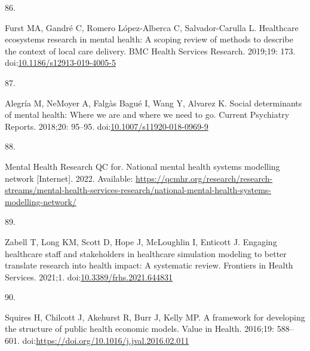 \documentclass[
]{article}
\newlength{\cslhangindent}
\newlength{\csllabelwidth}
\newlength{\cslentryspacingunit} %
\newenvironment{CSLReferences}[2] %
 {%
  \setlength{\parindent}{0pt}
  \ifodd #1
  \let\oldpar\par
  \def\par{\hangindent=\cslhangindent\oldpar}
  \fi
  \setlength{\parskip}{#2\cslentryspacingunit}
 }%
 {}
\newcommand{\CSLLeftMargin}[1]{\parbox[t]{\csllabelwidth}{#1}}
\newcommand{\CSLRightInline}[1]{\parbox[t]{\linewidth - \csllabelwidth}{#1}\break}
\begin{document}
\begin{CSLReferences}{0}{0}
\leavevmode{}%
\CSLLeftMargin{86. }%
\CSLRightInline{Furst MA, Gandré C, Romero López-Alberca C, Salvador-Carulla L. Healthcare ecosystems research in mental health: A scoping review of methods to describe the context of local care delivery. BMC Health Services Research. 2019;19: 173. doi:\href{https://doi.org/10.1186/s12913-019-4005-5}{10.1186/s12913-019-4005-5}}

\leavevmode{}%
\CSLLeftMargin{87. }%
\CSLRightInline{Alegría M, NeMoyer A, Falgàs Bagué I, Wang Y, Alvarez K. Social determinants of mental health: Where we are and where we need to go. Current Psychiatry Reports. 2018;20: 95--95. doi:\href{https://doi.org/10.1007/s11920-018-0969-9}{10.1007/s11920-018-0969-9}}

\leavevmode{}%
\CSLLeftMargin{88. }%
\CSLRightInline{Mental Health Research QC for. National mental health systems modelling network {[}Internet{]}. 2022. Available: \url{https://qcmhr.org/research/research-streams/mental-health-services-research/national-mental-health-systems-modelling-network/}}

\leavevmode{}%
\CSLLeftMargin{89. }%
\CSLRightInline{Zabell T, Long KM, Scott D, Hope J, McLoughlin I, Enticott J. Engaging healthcare staff and stakeholders in healthcare simulation modeling to better translate research into health impact: A systematic review. Frontiers in Health Services. 2021;1. doi:\href{https://doi.org/10.3389/frhs.2021.644831}{10.3389/frhs.2021.644831}}

\leavevmode{}%
\CSLLeftMargin{90. }%
\CSLRightInline{Squires H, Chilcott J, Akehurst R, Burr J, Kelly MP. A framework for developing the structure of public health economic models. Value in Health. 2016;19: 588--601. doi:\url{https://doi.org/10.1016/j.jval.2016.02.011}}

\end{CSLReferences}

\newpage
\appendix
{}
\end{document}
